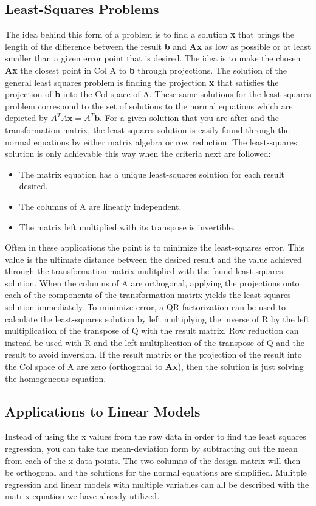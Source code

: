 \documentclass[12pt]{article}
\begin{document}
\subsection{Least-Squares Problems}
The idea behind this form of a problem is to find a solution \textbf{x} that brings the length of the difference between the result \textbf{b} and \textbf{Ax} as low as possible or at 
least smaller than a given error point that is desired. The idea is to make the chosen \textbf{Ax} the closest point in Col A to \textbf{b} through projections. The solution of the general 
least squares problem is finding the projection \textbf{x} that satisfies the projection of \textbf{b} into the Col space of A. These same solutions for the least squares problem 
correspond to the set of solutions to the normal equations which are depicted by $A^TA\mathbf{x}=A^T\mathbf{b}$. For a given solution that you are after and the transformation matrix, 
the least squares solution is easily found through the normal equations by either matrix algebra or row reduction. The least-squares solution is only achievable this way when the criteria next are followed:
\begin{itemize}
    \item The matrix equation has a unique least-squares solution for each result desired. 
    \item The columns of A are linearly independent.
    \item The matrix left multiplied with its transpose is invertible. 
\end{itemize}
Often in these applications the point is to minimize the least-squares error. This value is the ultimate distance between the desired result and the value achieved through the transformation 
matrix mulitplied with the found least-squares solution. When the columns of A are orthogonal, applying the projections onto each of the components of the transformation matrix 
yields the least-squares solution immediately. To minimize error, a QR factorization can be used to calculate the least-squares solution by left multiplying the inverse of R by 
the left multiplication of the transpose of Q with the result matrix. Row reduction can instead be used with R and the left multiplication of the transpose of Q and the result 
to avoid inversion. If the result matrix or the projection of the result into the Col space of A are zero (orthogonal to \textbf{Ax}), then the solution is just solving the homogeneous equation.
\subsection{Applications to Linear Models}
Instead of using the x values from the raw data in order to find the least squares regression, you can take the mean-deviation form by subtracting out the mean from each of the x 
data points. The two columns of the design matrix will then be orthogonal and the solutions for the normal equations are simplified. Mulitple regression and linear models with multiple 
variables can all be described with the matrix equation we have already utilized. 
\end{document}
